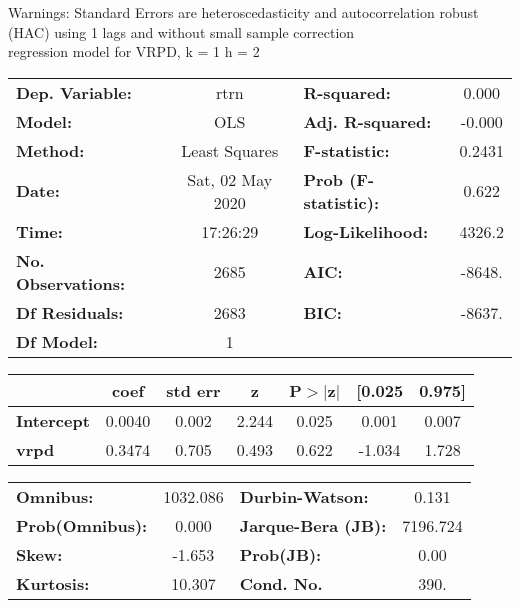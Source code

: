 Warnings: \newline
 [1] Standard Errors are heteroscedasticity and autocorrelation robust (HAC) using 1 lags and without small sample correction\\ 

regression model for VRPD, k = 1 h = 2\begin{center}
\begin{tabular}{lclc}
\toprule
\textbf{Dep. Variable:}    &       rtrn       & \textbf{  R-squared:         } &     0.000   \\
\textbf{Model:}            &       OLS        & \textbf{  Adj. R-squared:    } &    -0.000   \\
\textbf{Method:}           &  Least Squares   & \textbf{  F-statistic:       } &    0.2431   \\
\textbf{Date:}             & Sat, 02 May 2020 & \textbf{  Prob (F-statistic):} &    0.622    \\
\textbf{Time:}             &     17:26:29     & \textbf{  Log-Likelihood:    } &    4326.2   \\
\textbf{No. Observations:} &        2685      & \textbf{  AIC:               } &    -8648.   \\
\textbf{Df Residuals:}     &        2683      & \textbf{  BIC:               } &    -8637.   \\
\textbf{Df Model:}         &           1      & \textbf{                     } &             \\
\bottomrule
\end{tabular}
\begin{tabular}{lcccccc}
                   & \textbf{coef} & \textbf{std err} & \textbf{z} & \textbf{P$> |$z$|$} & \textbf{[0.025} & \textbf{0.975]}  \\
\midrule
\textbf{Intercept} &       0.0040  &        0.002     &     2.244  &         0.025        &        0.001    &        0.007     \\
\textbf{vrpd}      &       0.3474  &        0.705     &     0.493  &         0.622        &       -1.034    &        1.728     \\
\bottomrule
\end{tabular}
\begin{tabular}{lclc}
\textbf{Omnibus:}       & 1032.086 & \textbf{  Durbin-Watson:     } &    0.131  \\
\textbf{Prob(Omnibus):} &   0.000  & \textbf{  Jarque-Bera (JB):  } & 7196.724  \\
\textbf{Skew:}          &  -1.653  & \textbf{  Prob(JB):          } &     0.00  \\
\textbf{Kurtosis:}      &  10.307  & \textbf{  Cond. No.          } &     390.  \\
\bottomrule
\end{tabular}
\end{center}


